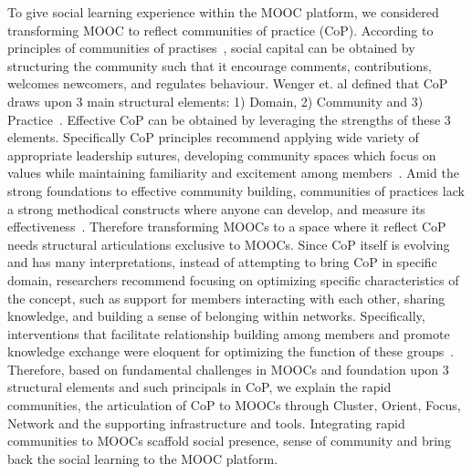 \documentclass[manuscript,screen,review]{acmart}
\begin{document}
To give social learning experience within the MOOC platform, we considered transforming MOOC to reflect communities of practice (CoP). According to principles of communities of practises~\cite{wenger2002seven}, social capital can be obtained by structuring the community such that it encourage comments, contributions, welcomes newcomers, and regulates behaviour. Wenger et. al defined that CoP draws upon 3 main structural elements: 1) Domain, 2) Community and 3) Practice~\cite{wenger2002cultivating}. Effective CoP can be obtained by leveraging the strengths of these 3 elements. Specifically CoP principles recommend applying wide variety of appropriate leadership sutures, developing community spaces which focus on values while maintaining familiarity and excitement among members~\cite{wenger2002cultivating}. Amid the strong foundations to effective community building, communities of practices lack a strong methodical constructs where anyone can develop, and measure its effectiveness~\cite{li2009evolution}. Therefore transforming MOOCs to a space where it reflect CoP needs structural articulations exclusive to MOOCs. Since CoP itself is evolving and has many interpretations, instead of attempting to bring CoP in specific domain, researchers recommend focusing on optimizing specific characteristics of the concept, such as support for members interacting with each other, sharing knowledge, and building a sense of belonging within networks. Specifically, interventions that facilitate relationship building among members and promote knowledge exchange were eloquent for optimizing the function of these groups~\cite{li2009evolution}. Therefore, based on fundamental challenges in MOOCs and foundation upon 3 structural elements and such principals in CoP, we explain the rapid communities, the articulation of CoP to MOOCs through Cluster, Orient, Focus, Network and the supporting infrastructure and tools. Integrating rapid communities to MOOCs scaffold social presence, sense of community and bring back the social learning to the MOOC platform. 
\end{document}
